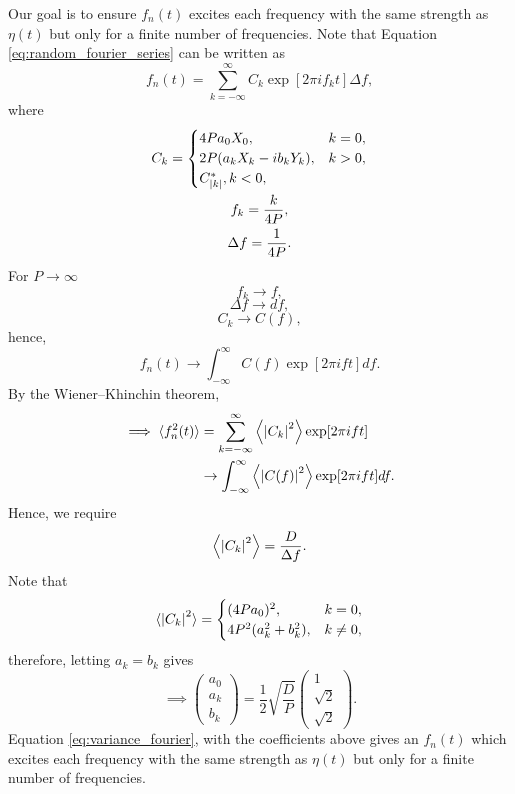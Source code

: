 Our goal is to ensure $f_n(t)$ excites each frequency with the same strength as $\eta(t)$ but only for a finite number of frequencies.
Note that Equation \eqref{eq:random_fourier_series} can be written as
\begin{equation}
    f_n(t) = \sum_{k=-\infty}^\infty C_k\exp[2\pi i f_k t] \Delta f,
\end{equation}
where
\begin{gather}
     C_k = \begin{cases}
    4Pa_0 X_0, & k=0, \\
    2P(a_kX_k - i b_k Y_k), & k>0, \\
    C^*_{\abs{k}}, k<0,
    \end{cases} \\
    f_k = \frac{k}{4P}, \\
    \Delta f = \frac{1}{4P}.
\end{gather}
For $P\rightarrow\infty$
\[f_k \rightarrow f,\]
\[\Delta f \rightarrow df,\]
\[C_k \rightarrow C(f),\]
hence,
\begin{equation}
    f_n(t) \rightarrow \int_{-\infty}^\infty C(f) \exp[2\pi i f t] df.
\end{equation}
By the Wiener–Khinchin theorem,
\begin{equation}
    \begin{aligned}
    \implies \langle f_n^2(t)\rangle &= \sum_{k=-\infty}^\infty \left\langle\abs{C_k}^2\right\rangle\exp[2\pi i f t] \\
    &\rightarrow \int_{-\infty}^\infty \left\langle\abs{C(f)}^2\right\rangle \exp[2\pi i f t] d f. \\
    \end{aligned}
\end{equation}
Hence, we require
\begin{equation}
    \left\langle\abs{C_k}^2\right\rangle = \frac{D}{\Delta f}.
\end{equation}
Note that
\begin{equation}
    \langle \abs{C_k}^2 \rangle = \begin{cases}
    (4Pa_0)^2, & k=0, \\
    4P^2(a_k^2 + b_k^2), & k\ne0,
    \end{cases}
\end{equation}
therefore, letting $a_k=b_k$ gives
\begin{equation}
\label{eq:coeffs_ak_bk}
\implies
    \begin{pmatrix}
    a_0 \\
    a_k \\
    b_k
    \end{pmatrix}
    = \frac{1}{2}\sqrt{\frac{D}{P}}
    \begin{pmatrix}
    1 \\
    \sqrt{2} \\
    \sqrt{2}
    \end{pmatrix}.
\end{equation}
Equation \eqref{eq:variance_fourier}, with the coefficients above gives an  $f_n(t)$ which excites each frequency with the same strength as $\eta(t)$ but only for a finite number of frequencies.

